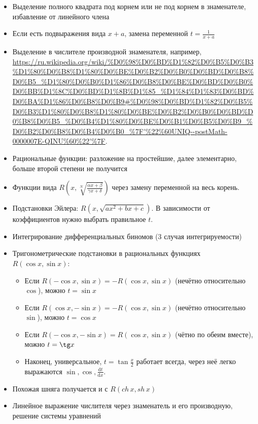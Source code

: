 \documentclass[12pt, a4paper]{article}
\begin{document}
\begin{itemize}
\begin{itemize}
      \item Выделение полного квадрата под корнем или не под корнем в знаменателе, избавление от линейного члена
      \item Если есть подвыражения вида $x + a$, замена переменной $t = \frac{1}{x + a}$
      \item Выделение в числителе производной знаменателя, например, \url{https://ru.wikipedia.org/wiki/%D0%98%D0%BD%D1%82%D0%B5%D0%B3%D1%80%D0%B8%D1%80%D0%BE%D0%B2%D0%B0%D0%BD%D0%B8%D0%B5_%D1%80%D0%B0%D1%86%D0%B8%D0%BE%D0%BD%D0%B0%D0%BB%D1%8C%D0%BD%D1%8B%D1%85_%D1%84%D1%83%D0%BD%D0%BA%D1%86%D0%B8%D0%B9#%D0%98%D0%BD%D1%82%D0%B5%D0%B3%D1%80%D0%B8%D1%80%D0%BE%D0%B2%D0%B0%D0%BD%D0%B8%D0%B5_%D0%B4%D1%80%D0%BE%D0%B1%D0%B5%D0%B9_%D0%B2%D0%B8%D0%B4%D0%B0_%7F'%22%60UNIQ--postMath-0000007E-QINU%60%22'%7F}.
      \item Рациональные функции: разложение на простейшие, далее элементарно, больше второй степени не получится
      \item Функции вида $R\left(x, \sqrt[N]{\frac{\alpha x + \beta}{\gamma x + \delta}}\right)$ через замену переменной на весь корень.
      \item Подстановки Эйлера: $R\left(x, \sqrt{ax^2 + bx + c}\right)$. В зависимости от коэффициентов нужно выбрать правильное $t$.
      \item Интегрирование дифференциальных биномов (3 случая интегрируемости)
      \item Тригонометрические подстановки в рациональных функциях $R(\cos x, \sin x)$:
      \begin{itemize}
        \item Если $R(-\cos x, \sin x) = -R(\cos x, \sin x)$ (нечётно относительно $\cos$), можно $t = \sin x$
        \item Если $R(\cos x, -\sin x) = -R(\cos x, \sin x)$ (нечётно относительно $\sin$), можно $t = \cos x$
        \item Если $R(-\cos x, -\sin x) = R(\cos x, \sin x)$ (чётно по обеим вместе), можно $t = \tg x$
        \item Наконец, универсальное, $t = \tan \frac{x}{2}$ работает всегда, через неё легко выражаются $\sin, \cos, \frac{\mathrm{d}t}{\mathrm{d}x}$.
      \end{itemize}
      \item Похожая шняга получается и с $R(ch\, x, sh\, x)$
      \item Линейное выражение числителя через знаменатель и его производную, решение системы уравнений
    \end{itemize}

\end{itemize}
\end{document}
